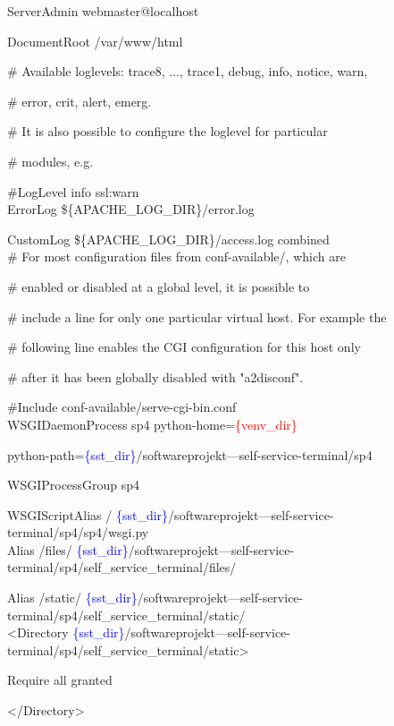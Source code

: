 	ServerAdmin webmaster@localhost\par
	DocumentRoot /var/www/html\\
	
	\newpage
	
	\# Available loglevels: trace8, ..., trace1, debug, info, notice, warn,\par
	\# error, crit, alert, emerg.\par
	\# It is also possible to configure the loglevel for particular\par
	\# modules, e.g.\par
	\#LogLevel info ssl:warn\\

	ErrorLog \$\{APACHE\_LOG\_DIR\}/error.log\par
	CustomLog \$\{APACHE\_LOG\_DIR\}/access.log combined\\

	\# For most configuration files from conf-available/, which are\par
	\# enabled or disabled at a global level, it is possible to\par
	\# include a line for only one particular virtual host. For example the\par
	\# following line enables the CGI configuration for this host only\par
	\# after it has been globally disabled with "a2disconf".\par
	\#Include conf-available/serve-cgi-bin.conf\\
	
	WSGIDaemonProcess sp4 python-home=\textcolor{red}{\{venv\_dir\}}\par python-path=\textcolor{blue}{\{sst\_dir\}}/softwareprojekt---self-service-terminal/sp4\par
	WSGIProcessGroup sp4 \par
	WSGIScriptAlias / \textcolor{blue}{\{sst\_dir\}}/softwareprojekt---self-service-terminal/sp4/sp4/wsgi.py\\
	
	Alias /files/ \textcolor{blue}{\{sst\_dir\}}/softwareprojekt---self-service-terminal/sp4/self\_service\_terminal/files/\par
	Alias /static/ \textcolor{blue}{\{sst\_dir\}}/softwareprojekt---self-service-terminal/sp4/self\_service\_terminal/static/\\

	<Directory \textcolor{blue}{\{sst\_dir\}}/softwareprojekt---self-service-terminal/sp4/self\_service\_terminal/static>\par
	Require all granted\par
	</Directory>\\


